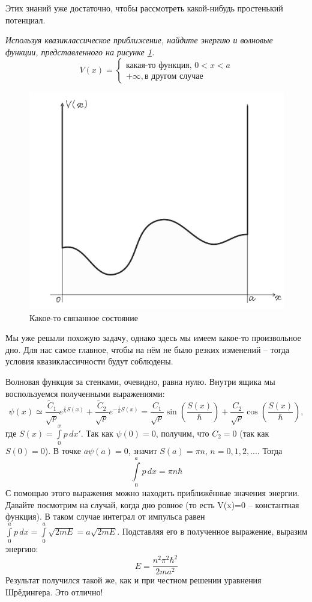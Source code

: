 Этих знаний уже достаточно, чтобы рассмотреть какой-нибудь простенький потенциал.
\begin{center}
    \textit{Используя квазиклассическое приближение, найдите энергию и волновые функции, представленного на рисунке \ref{fig 11.1}.}
    \[
    V(x) = 
    \begin{cases}
    \text{какая-то функция, } 0<x<a\\
    +\infty, \text{в другом случае}
    \end{cases}
    \]
\end{center}
\begin{figure}[ht]
\centering
\includegraphics[scale=0.2]{class 11/images/bound-state.jpg}
\caption{Какое-то связанное состояние}
\label{fig 11.1}
\end{figure}
Мы уже решали похожую задачу, однако здесь мы имеем какое-то произвольное дно. Для нас самое главное, чтобы на нём не было резких изменений -- тогда условия квазиклассичности будут соблюдены.

Волновая функция за стенками, очевидно, равна нулю. Внутри ящика мы воспользуемся полученными выражениями:
\[
\psi(x) \simeq \frac{\widetilde{C}_1}{\sqrt{p}}e^{\frac{i}{\hbar}S(x)} + \frac{\widetilde{C}_2}{\sqrt{p}}e^{-\frac{i}{\hbar}S(x)} = \frac{C_1}{\sqrt{p}}\sin (\frac{S(x)}{\hbar}) + \frac{C_2}{\sqrt{p}}\cos(\frac{S(x)}{\hbar}),
\]
где $S(x) = \int\limits_{0}^{x}p\, dx'$. Так как $\psi(0) = 0$, получим, что $C_2 = 0$ (так как $S(0) = 0$). В точке $a \psi(a) = 0$, значит $S(a) = \pi n$, $n = 0, 1, 2, ...$. Тогда
\[
\int\limits_{0}^{a}p\, dx = \pi n \hbar
\]
С помощью этого выражения можно находить приближённые значения энергии. Давайте посмотрим на случай, когда дно ровное (то есть V(x)=0 -- константная функция). В таком случае интеграл от импульса равен $\int\limits_{0}^{a}p\, dx = \int\limits_{0}^{a}\sqrt{2mE} = a\sqrt{2mE}$. Подставляя его в полученное выражение, выразим энергию:
\[
E = \frac{n^2\pi^2\hbar^2}{2ma^2}
\]
Результат получился такой же, как и при честном решении уравнения Шрёдингера. Это отлично!

